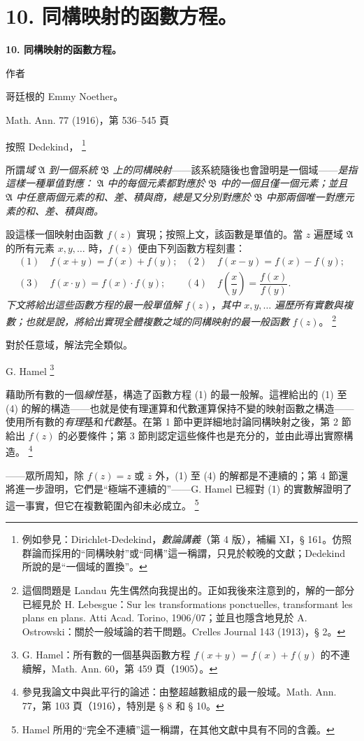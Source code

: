 \documentclass[11pt]{article}
\providecommand{\qtext}[1]{“#1”}
\providecommand{\Afield}{\mathfrak A}
\providecommand{\Bfield}{\mathfrak B}
\providecommand{\srcfn}[2]{%
  \begingroup\renewcommand{\thefootnote}{#1}\footnote{#2}\addtocounter{footnote}{-1}\endgroup}
\begin{document}
\setcounter{footnote}{0}
\section*{10. 同構映射的函數方程。}
\begin{center}
{\Large\bfseries 10. 同構映射的函數方程。}\par
\vspace{0.75em}
作者\par
\vspace{0.75em}
哥廷根的 Emmy Noether。\par
\vspace{1em}
Math. Ann. 77 (1916)，第 536--545 頁
\end{center}

\vspace{3em}

按照 Dedekind，\srcfn{*)}{例如參見：Dirichlet-Dedekind，\emph{數論講義}（第 4 版），補編 XI，§ 161。仿照群論而採用的\qtext{同構映射}或\qtext{同構}這一稱謂，只見於較晚的文獻；Dedekind 所說的是\qtext{一個域的置換}。}所謂\emph{域} \(\Afield\) \emph{到一個系統} \(\Bfield\) \emph{上的同構映射}——該系統隨後也會證明是一個域——\emph{是指這樣一種單值對應：} \(\Afield\) \emph{中的每個元素都對應於} \(\Bfield\) \emph{中的一個且僅一個元素；並且} \(\Afield\) \emph{中任意兩個元素的和、差、積與商，總是又分別對應於} \(\Bfield\) \emph{中那兩個唯一對應元素的和、差、積與商。}

設這樣一個映射由函數 \(f(z)\) 實現；按照上文，該函數是單值的。當 \(z\) 遍歷域 \(\Afield\) 的所有元素 \(x,y,\ldots\) 時，\(f(z)\) 便由下列函數方程刻畫：
\[
\begin{array}{ll}
(1)\quad f(x+y)=f(x)+f(y); & (2)\quad f(x-y)=f(x)-f(y);\\[0.45em]
(3)\quad f(x\cdot y)=f(x)\cdot f(y); & (4)\quad f\!\left(\dfrac{x}{y}\right)=\dfrac{f(x)}{f(y)}.
\end{array}
\]
\emph{下文將給出這些函數方程的最一般單值解} \(f(z)\)，\emph{其中} \(x,y,\ldots\) \emph{遍歷所有實數與複數；也就是說，將給出實現全體複數之域的同構映射的最一般函數} \(f(z)\)。\srcfn{**)}{這個問題是 Landau 先生偶然向我提出的。正如我後來注意到的，解的一部分已經見於 H. Lebesgue：Sur les transformations ponctuelles, transformant les plans en plans. Atti Acad. Torino, 1906/07；並且也隱含地見於 A. Ostrowski：關於一般域論的若干問題。Crelles Journal 143 (1913)，§ 2。}對於任意域，解法完全類似。

G. Hamel\srcfn{*)}{G. Hamel：所有數的一個基與函數方程 \(f(x+y)=f(x)+f(y)\) 的不連續解，Math. Ann. 60，第 459 頁（1905）。}藉助所有數的一個\emph{線性}基，構造了函數方程 (1) 的最一般解。這裡給出的 (1) 至 (4) 的解的構造——也就是使有理運算和代數運算保持不變的映射函數之構造——使用所有數的\emph{有理}基和\emph{代數}基。在第 1 節中更詳細地討論同構映射之後，第 2 節給出 \(f(z)\) 的必要條件；第 3 節則認定這些條件也是充分的，並由此導出實際構造。\srcfn{**)}{參見我論文中與此平行的論述：由整超越數組成的最一般域。Math. Ann. 77，第 103 頁（1916），特別是 § 8 和 § 10。}——眾所周知，除 \(f(z)=z\) 或 \(\overline z\) 外，(1) 至 (4) 的解都是不連續的；第 4 節還將進一步證明，它們是\qtext{極端不連續的}——G. Hamel 已經對 (1) 的實數解證明了這一事實，但它在複數範圍內卻未必成立。\srcfn{***)}{Hamel 所用的\qtext{完全不連續}這一稱謂，在其他文獻中具有不同的含義。}
\end{document}
